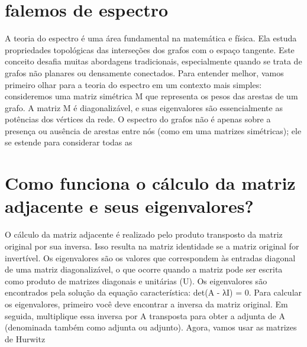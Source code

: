 \documentclass[11pt,a4paper]{article}
\begin{document}
\maketitle
\begin{abstract}Exploração do ollama a partir de sementes banais (nível 1). Teoria continua de fora.\end{abstract}
\section{falemos de espectro}
A teoria do espectro é uma área fundamental na matemática e física. Ela estuda propriedades topológicas das interseções dos grafos com o espaço tangente. Este conceito desafia muitas abordagens tradicionais, especialmente quando se trata de grafos não planares ou densamente conectados. Para entender melhor, vamos primeiro olhar para a teoria do espectro em um contexto mais simples: consideremos uma matriz simétrica M que representa os pesos das arestas de um grafo. A matriz M é diagonalizável, e suas eigenvalores são essencialmente as potências dos vértices da rede. O espectro do grafos não é apenas sobre a presença ou ausência de arestas entre nós (como em uma matrizes simétricas); ele se estende para considerar todas as

\section{Como funciona o cálculo da matriz adjacente e seus eigenvalores?}
O cálculo da matriz adjacente é realizado pelo produto transposto da matriz original por sua inversa. Isso resulta na matriz identidade se a matriz original for invertível. Os eigenvalores são os valores que correspondem às entradas diagonal de uma matriz diagonalizável, o que ocorre quando a matriz pode ser escrita como produto de matrizes diagonais e unitárias (U). Os eigenvalores são encontrados pela solução da equação característica: det(A - λI) = 0. Para calcular os eigenvalores, primeiro você deve encontrar a inversa da matriz original. Em seguida, multiplique essa inversa por A transposta para obter a adjunta de A (denominada também como adjunta ou adjunto). Agora, vamos usar as matrizes de Hurwitz
\end{document}
